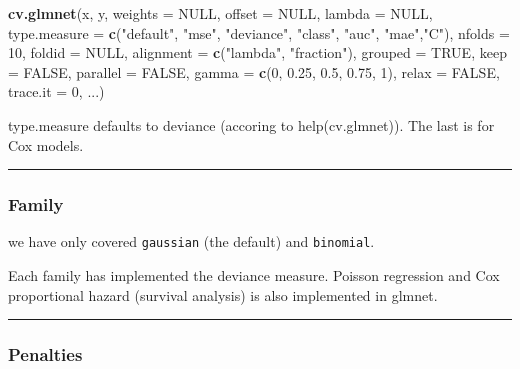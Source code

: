 \documentclass[
]{article}
\newenvironment{Shaded}{\begin{snugshade}}{\end{snugshade}}
\newcommand{\DataTypeTok}[1]{\textcolor[rgb]{0.13,0.29,0.53}{#1}}
\newcommand{\DecValTok}[1]{\textcolor[rgb]{0.00,0.00,0.81}{#1}}
\newcommand{\FloatTok}[1]{\textcolor[rgb]{0.00,0.00,0.81}{#1}}
\newcommand{\KeywordTok}[1]{\textcolor[rgb]{0.13,0.29,0.53}{\textbf{#1}}}
\newcommand{\NormalTok}[1]{#1}
\newcommand{\OtherTok}[1]{\textcolor[rgb]{0.56,0.35,0.01}{#1}}
\newcommand{\StringTok}[1]{\textcolor[rgb]{0.31,0.60,0.02}{#1}}
\begin{document}
\begin{Shaded}
\begin{Highlighting}[]
\KeywordTok{cv.glmnet}\NormalTok{(x, y, }\DataTypeTok{weights =} \OtherTok{NULL}\NormalTok{, }\DataTypeTok{offset =} \OtherTok{NULL}\NormalTok{, }\DataTypeTok{lambda =} \OtherTok{NULL}\NormalTok{,}
  \DataTypeTok{type.measure =} \KeywordTok{c}\NormalTok{(}\StringTok{"default"}\NormalTok{, }\StringTok{"mse"}\NormalTok{, }\StringTok{"deviance"}\NormalTok{, }\StringTok{"class"}\NormalTok{, }\StringTok{"auc"}\NormalTok{, }\StringTok{"mae"}\NormalTok{,}\StringTok{"C"}\NormalTok{),}
  \DataTypeTok{nfolds =} \DecValTok{10}\NormalTok{, }\DataTypeTok{foldid =} \OtherTok{NULL}\NormalTok{, }
  \DataTypeTok{alignment =} \KeywordTok{c}\NormalTok{(}\StringTok{"lambda"}\NormalTok{, }\StringTok{"fraction"}\NormalTok{), }\DataTypeTok{grouped =} \OtherTok{TRUE}\NormalTok{, }
  \DataTypeTok{keep =} \OtherTok{FALSE}\NormalTok{, }\DataTypeTok{parallel =} \OtherTok{FALSE}\NormalTok{,}
  \DataTypeTok{gamma =} \KeywordTok{c}\NormalTok{(}\DecValTok{0}\NormalTok{, }\FloatTok{0.25}\NormalTok{, }\FloatTok{0.5}\NormalTok{, }\FloatTok{0.75}\NormalTok{, }\DecValTok{1}\NormalTok{), }\DataTypeTok{relax =} \OtherTok{FALSE}\NormalTok{, }\DataTypeTok{trace.it =} \DecValTok{0}\NormalTok{, ...)}
\end{Highlighting}
\end{Shaded}

type.measure defaults to deviance (accoring to help(cv.glmnet)). The
last is for Cox models.

\begin{center}\rule{0.5\linewidth}{0.5pt}\end{center}

\hypertarget{family}{%
\subsubsection{Family}\label{family}}

we have only covered \texttt{gaussian} (the default) and
\texttt{binomial}.

Each family has implemented the deviance measure. Poisson regression and
Cox proportional hazard (survival analysis) is also implemented in
glmnet.

\begin{center}\rule{0.5\linewidth}{0.5pt}\end{center}

\hypertarget{penalties}{%
\subsubsection{Penalties}\label{penalties}}
\end{document}
